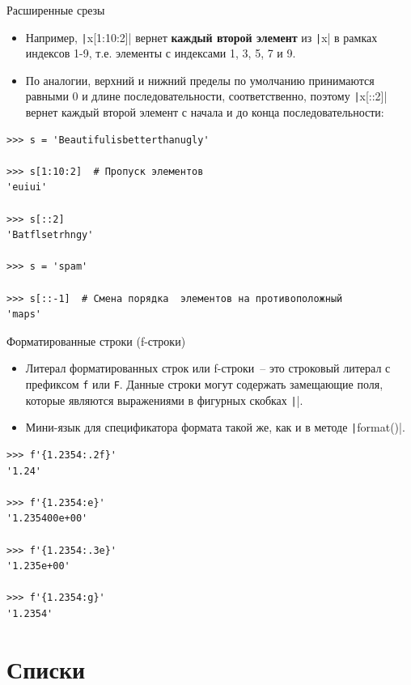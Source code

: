 \documentclass[aspectratio=169, mathserif]{beamer}%
\begin{document}
\begin{frame}[fragile]{Расширенные срезы}
\scriptsize
\begin{itemize}
\item Например, \texttt|x[1:10:2]| вернет \textcolor{extraorange}{\textbf{каждый второй элемент}} из \texttt|x| в рамках индексов 1-9, т.е. элементы с индексами 1, 3, 5, 7 и 9. 

\item По аналогии, верхний и нижний пределы по умолчанию принимаются равными 0 и длине последовательности, соответственно, поэтому \texttt|x[::2]| вернет каждый второй элемент с начала и до конца последовательности:
\end{itemize}

\begin{verbatim}
>>> s = 'Beautifulisbetterthanugly'

>>> s[1:10:2]  # Пропуск элементов
'euiui'

>>> s[::2]
'Batflsetrhngy'

>>> s = 'spam'  

>>> s[::-1]  # Смена порядка  элементов на противоположный 
'maps'
\end{verbatim}
\vfill
\end{frame}


\begin{frame}[fragile]{Форматированные строки (f-строки)}
\scriptsize
\begin{itemize}
\item Литерал форматированных строк или f-строки~-- это строковый литерал с префиксом \texttt{f} или \texttt{F}. Данные строки могут содержать замещающие поля, которые являются выражениями в фигурных скобках \texttt|{}|.

\item Мини-язык для спецификатора формата такой же, как и в методе \texttt|format()|.
\end{itemize}

\begin{verbatim}
>>> f'{1.2354:.2f}'
'1.24'

>>> f'{1.2354:e}'
'1.235400e+00'

>>> f'{1.2354:.3e}'
'1.235e+00'

>>> f'{1.2354:g}'
'1.2354'
\end{verbatim}
\vfill
\end{frame}


\section{Списки}
\sectionframe
\end{document}
